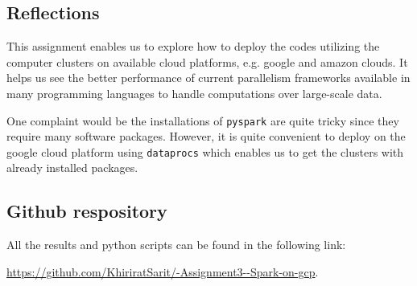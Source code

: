 \documentclass[]{article}
\begin{document}
\subsection{Reflections}

This assignment enables us to explore how to deploy the codes utilizing the computer clusters on available cloud platforms, e.g. google and amazon clouds. It helps us see the better performance of current parallelism frameworks available in many programming languages to handle computations over large-scale data. 

One complaint would be the installations of \texttt{pyspark} are quite tricky since they require many software packages. However, it is quite convenient to deploy on the google cloud platform using \texttt{dataprocs} which enables us to get the clusters with already installed packages. 

\hypertarget{github-respository}{%
\subsection{Github respository}\label{github-respository}}

All the results and python scripts can be found in the following link:

\url{https://github.com/KhiriratSarit/-Assignment3--Spark-on-gcp}.
\end{document}
